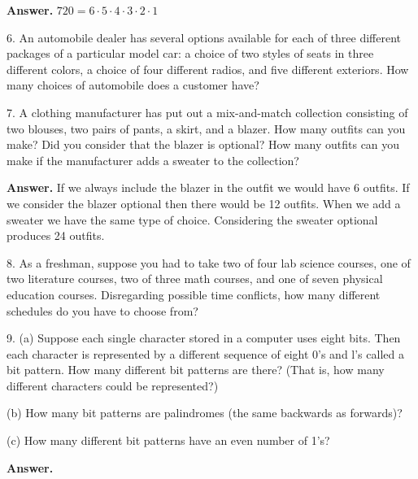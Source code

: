 \documentclass[10pt,]{book}
\theoremstyle{plain}
\theoremstyle{definition}
\theoremstyle{definition}
\theoremstyle{definition}
\begin{document}
\begin{exercisegroup}
\par\smallskip
\par\smallskip
\noindent\textbf{Answer.}\hypertarget{answer-3}{}\quad
 \(720=6\cdot 5\cdot 4\cdot 3\cdot 2\cdot 1\)%
\item[6.]\hypertarget{exercise-6}{} An automobile dealer has several options available for each of three different packages of a particular model car: a choice of two styles of seats in three different colors, a choice of four different radios, and five different exteriors. How many choices of automobile does a customer have?%
\par\smallskip
\item[7.]\hypertarget{exercise-7}{} A clothing manufacturer has put out a mix-and-match collection consisting of two blouses, two pairs of pants, a skirt, and a blazer. How many outfits can you make? Did you consider that the blazer is optional? How many outfits can you make if the manufacturer adds a sweater to the collection?%
\par\smallskip
\par\smallskip
\noindent\textbf{Answer.}\hypertarget{answer-4}{}\quad
If we always include the blazer in the outfit we would have 6 outfits. If we
consider the blazer optional then there would be 12 outfits. When we add a
sweater we have the same type of choice. Considering the sweater optional
produces 24 outfits.%
\item[8.]\hypertarget{exercise-8}{} As a freshman, suppose you had to take two of four lab science courses, one of two literature courses, two of three math courses, and one of seven physical education courses. Disregarding possible time conflicts, how many different schedules do you have to choose from?%
\par\smallskip
\item[9.]\hypertarget{exercise-9}{} (a) Suppose each single character stored in a computer uses eight bits. Then each character is represented by a different sequence of eight 0's and l's called a bit pattern. How many different bit patterns are there? (That is, how many different characters could be represented?)%
\par
 (b) How many bit patterns are palindromes (the same backwards as forwards)?%
\par
 (c) How many different bit patterns have an even number of 1's?%
\par\smallskip
\par\smallskip
\noindent\textbf{Answer.}\hypertarget{answer-5}{}\quad
\leavevmode%
\begin{enumerate}[label=\alph*]

\end{enumerate}
\end{exercisegroup}
\end{document}
